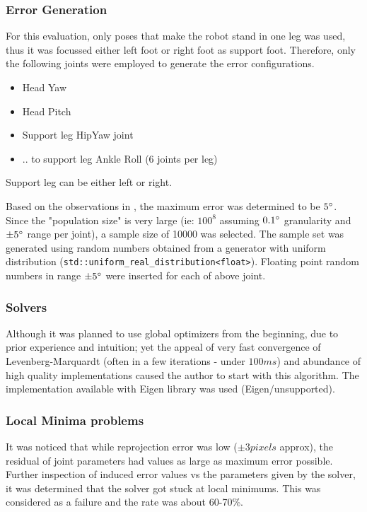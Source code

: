 \documentclass[english, printversion, nomenclature, notitle]{tuvisionthesis} %
\begin{document}
\subsubsection{Error Generation}
For this evaluation, only poses that make the robot stand in one leg was used, thus it was focussed either left foot or right foot as support foot. Therefore, only the following joints were employed to generate the error configurations.

\begin{itemize}
	\item Head Yaw
	\item Head Pitch
	\item Support leg HipYaw joint
	\item .. to support leg Ankle Roll (6 joints per leg)
\end{itemize}
Support leg can be either left or right.

Based on the observations in , the maximum error was determined to be $5\degree$. Since the "population size" is very large (ie: $100^8$ assuming $0.1\degree$ granularity and $\pm5\degree$ range per joint), a sample size of 10000 was selected. The sample set was generated using random numbers obtained from a generator with uniform distribution (\lstinline{std::uniform_real_distribution<float>}). Floating point random numbers in range $\pm5\degree$ were inserted for each of above joint. 

\subsubsection{Solvers}

Although it was planned to use global optimizers from the beginning, due to prior experience and intuition; yet the appeal of very fast convergence of Levenberg-Marquardt (often in a few iterations - under $100ms$) and abundance of high quality implementations caused the author to start with this algorithm. The implementation available with Eigen library was used (Eigen/unsupported).

\subsubsection{Local Minima problems}
It was noticed that while reprojection error was low ($\pm3 pixels$ approx), the residual of joint parameters had values as large as maximum error possible. Further inspection of induced error values vs the parameters given by the solver, it was determined that the solver got stuck at local minimums. This was considered as a failure and the rate was about 60-70\%.
\end{document}
